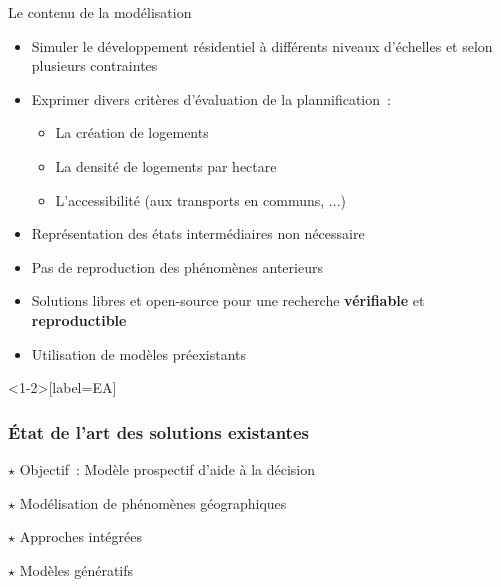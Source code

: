 \documentclass[xcolor=table]{beamer}
\begin{document}
\begin{frame}{Le contenu de la modélisation}
	\begin{itemize}
		\item<1-> Simuler le développement résidentiel à différents niveaux d'échelles et selon plusieurs contraintes
		\item<2-> Exprimer divers critères d'évaluation de la plannification~:
		\begin{itemize}	
			\item<3-> La création de logements
			\item<4-> La densité de logements par hectare
			\item<5-> L'accessibilité (aux transports en communs, ...)
		\end{itemize}
		\vspace{0.66cm}
		\item<6-> Représentation des états intermédiaires non nécessaire
		\item<7-> Pas de reproduction des phénomènes anterieurs
		\vspace{0.66cm}
		\item<8-> Solutions libres et open-source pour une recherche \textbf{vérifiable} et \textbf{reproductible}
		\item<9> Utilisation de modèles préexistants
	\end{itemize}
\end{frame}

\begin{frame}<1-2>[label=EA]
\frametitle{État de l'art des solutions existantes}
\begin{block}{}
		\alert<2>{$\star$ Objectif~: Modèle prospectif d'aide à la décision}
\end{block}
\begin{block}{}
		\alert<3>{$\star$ Modélisation de phénomènes géographiques}
\end{block}
\begin{block}{}
		\alert<4>{$\star$ Approches intégrées}
\end{block}
\begin{block}{}
		\alert<5>{$\star$ Modèles génératifs}
\end{block}
\end{frame}
\end{document}
